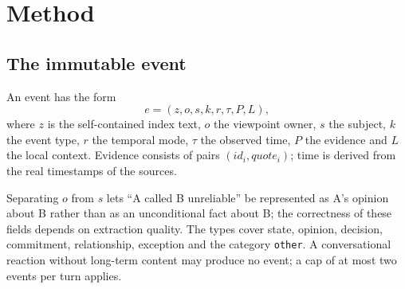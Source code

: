 \documentclass[11pt,a4paper]{article}
\begin{document}
\section{Method}
\label{sec:method}

\subsection{The immutable event}

An event has the form
\[
e=(z,o,s,k,r,\tau,P,L),
\]
where $z$ is the self-contained index text, $o$ the viewpoint owner, $s$ the
subject, $k$ the event type, $r$ the temporal mode, $\tau$ the observed time, $P$
the evidence and $L$ the local context. Evidence consists of pairs
$(id_i, quote_i)$; time is derived from the real timestamps of the sources.

Separating $o$ from $s$ lets ``A called B unreliable'' be represented as A's
opinion about B rather than as an unconditional fact about B; the correctness of
these fields depends on extraction quality. The types cover state, opinion,
decision, commitment, relationship, exception and the category \texttt{other}. A
conversational reaction without long-term content may produce no event; a cap of at
most two events per turn applies.

\end{document}
